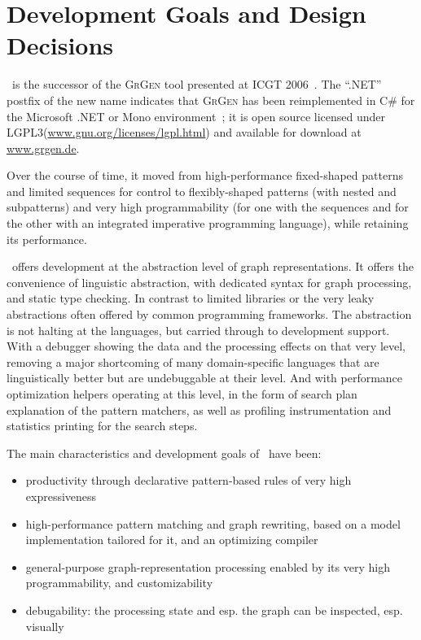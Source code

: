 \chapter{Development Goals and Design Decisions}\label{chp:designgoals}

\GrG~is the successor of the \textsc{GrGen} tool presented at ICGT 2006~\cite{GBGHS:06}.
The ``.NET'' postfix of the new name indicates that \textsc{GrGen} has been reimplemented in C\# for the Microsoft .NET or Mono environment~\cite{NET,MONO};
it is open source licensed under LGPL3(\url{www.gnu.org/licenses/lgpl.html}) and available for download at \url{www.grgen.de}.

Over the course of time, it moved from high-performance fixed-shaped patterns and limited sequences for control to flexibly-shaped patterns (with nested and subpatterns) and very high programmability (for one with the sequences and for the other with an integrated imperative programming language), while retaining its performance.

\GrG\ offers development at the abstraction level of graph representations.
It offers the convenience of linguistic abstraction, with dedicated syntax for graph processing, and static type checking.
In contrast to limited libraries or the very leaky abstractions often offered by common programming frameworks.
The abstraction is not halting at the languages, but carried through to development support.
With a debugger showing the data and the processing effects on that very level,
removing a major shortcoming of many domain-specific languages that are linguistically better but are undebuggable at their level.
And with performance optimization helpers operating at this level, in the form of search plan explanation of the pattern matchers, as well as profiling instrumentation and statistics printing for the search steps.

The main characteristics and development goals of \GrG\ have been:
\begin{itemize}
	\item productivity through declarative pattern-based rules of very high expressiveness
	\item high-performance pattern matching and graph rewriting, based on a model implementation tailored for it, and an optimizing compiler
	\item general-purpose graph-representation processing enabled by its very high programmability, and customizability
	\item debugability: the processing state and esp. the graph can be inspected, esp. visually
\end{itemize}

